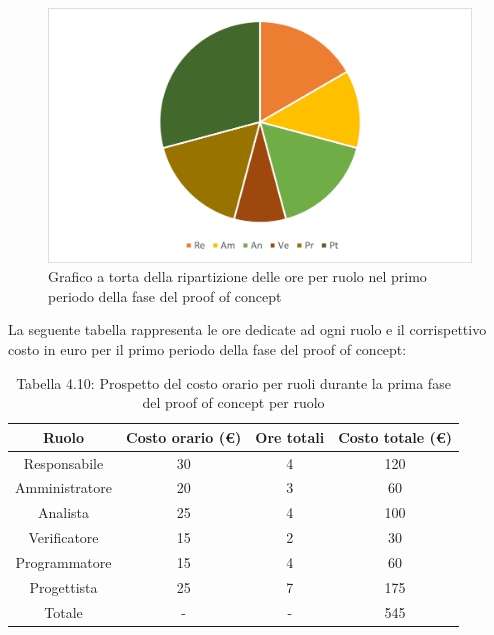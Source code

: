 \begin{figure}[H]
    \centering
    \includegraphics[scale=0.6]{img/grafi preventivo/torta/proof/periodo1.png}
    \caption{Grafico a torta della ripartizione delle ore per ruolo nel primo periodo della fase del proof of concept}
\end{figure}
La seguente tabella rappresenta le ore dedicate ad ogni ruolo e il corrispettivo costo in euro per il primo periodo della fase del proof of concept:
\begin{table}[h]
	\setlength\extrarowheight{5pt}
	\centering
	\begin{tabularx}{\textwidth}{|ccc|c|}
		\hline
		\rowcolor{white}
		\textbf{Ruolo} & \textbf{Costo orario (€)} & \textbf{Ore totali} & \textbf{Costo totale (€)} \\
		\hline
		Responsabile &30&4&120 \\
		Amministratore &20&3&60 \\
		Analista &25&4&100 \\
		Verificatore &15&2&30 \\
		Programmatore &15&4&60 \\
		Progettista &25&7&175 \\
		\hline
		Totale &-&-&545 \\
		\hline
	\end{tabularx}
    \vspace{10pt}
	\caption{Tabella 4.10: Prospetto del costo orario per ruoli durante la prima fase del proof of concept per ruolo}
\end{table}
\newpage
